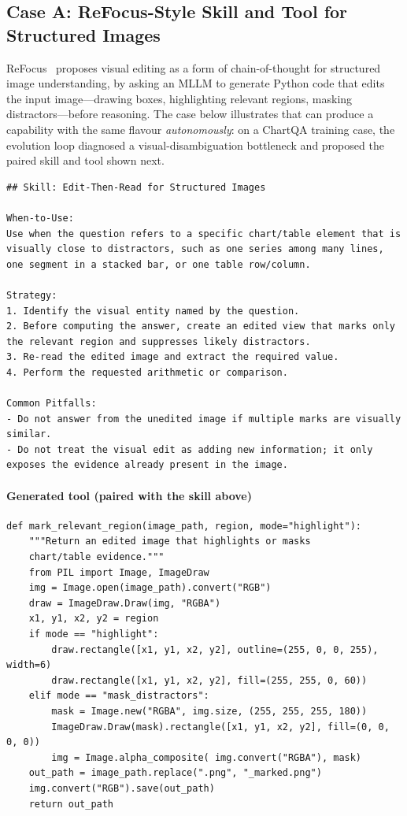 \subsection{Case A: ReFocus-Style Skill and Tool for Structured Images}
\label{app:refocus_style}

ReFocus~\citep{DBLP:conf/icml/FuLYCLY0FZ25} proposes visual editing as a form of
chain-of-thought for structured image understanding, by asking an MLLM to generate Python
code that edits the input image---drawing boxes, highlighting relevant regions, masking
distractors---before reasoning. The case below illustrates that \sysname{} can produce a
capability with the same flavour \emph{autonomously}: on a ChartQA training case, the
evolution loop diagnosed a visual-disambiguation bottleneck and proposed the paired skill
and tool shown next.

\begin{tcolorbox}[
    title={\textbf{Generated skill (paired with the tool below; triggered on ChartQA)}},
    casebox
]
\begin{lstlisting}[style=mdskill]
## Skill: Edit-Then-Read for Structured Images

When-to-Use:
Use when the question refers to a specific chart/table element that is visually close to distractors, such as one series among many lines, one segment in a stacked bar, or one table row/column.

Strategy:
1. Identify the visual entity named by the question.
2. Before computing the answer, create an edited view that marks only the relevant region and suppresses likely distractors.
3. Re-read the edited image and extract the required value.
4. Perform the requested arithmetic or comparison.

Common Pitfalls:
- Do not answer from the unedited image if multiple marks are visually similar.
- Do not treat the visual edit as adding new information; it only exposes the evidence already present in the image.
\end{lstlisting}
\end{tcolorbox}

\paragraph{Generated tool (paired with the skill above)}
\begin{lstlisting}[style=pycode]
def mark_relevant_region(image_path, region, mode="highlight"):
    """Return an edited image that highlights or masks
    chart/table evidence."""
    from PIL import Image, ImageDraw
    img = Image.open(image_path).convert("RGB")
    draw = ImageDraw.Draw(img, "RGBA")
    x1, y1, x2, y2 = region
    if mode == "highlight":
        draw.rectangle([x1, y1, x2, y2], outline=(255, 0, 0, 255), width=6)
        draw.rectangle([x1, y1, x2, y2], fill=(255, 255, 0, 60))
    elif mode == "mask_distractors":
        mask = Image.new("RGBA", img.size, (255, 255, 255, 180))
        ImageDraw.Draw(mask).rectangle([x1, y1, x2, y2], fill=(0, 0, 0, 0))
        img = Image.alpha_composite( img.convert("RGBA"), mask)
    out_path = image_path.replace(".png", "_marked.png")
    img.convert("RGB").save(out_path)
    return out_path
\end{lstlisting}

